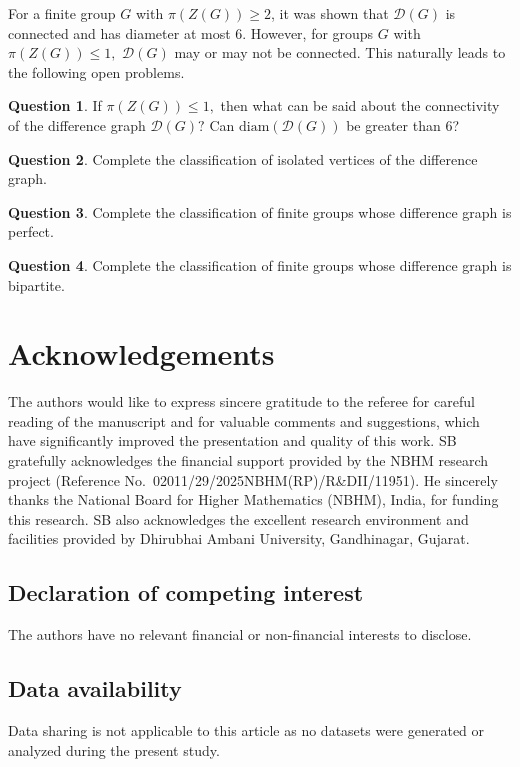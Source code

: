\documentclass[12pt]{amsart}
\theoremstyle{plain}
\theoremstyle{remark}
\theoremstyle{definition}
\newtheorem{question}{Question}[section]
\begin{document}
For a finite group $G$ with $\pi(Z(G))\geq 2$, it was shown that $\mathcal{D}(G)$ is connected 
and has diameter at most $6$. 
However, for groups $G$ with $\pi(Z(G))\leq 1,$  $\mathcal{D}(G)$ may or may not be connected. 
This naturally leads to the following open problems.

\begin{question}\label{Q111}
If $\pi(Z(G))\leq 1,$ then what can be said about the connectivity of the difference graph $\mathcal{D}(G)?$ Can 
$\mathrm{diam}(\mathcal{D}(G))$ be greater than $6$? 
\end{question}

\begin{question}\label{Q112}
Complete the classification of isolated vertices of the difference graph.
\end{question}

\begin{question}\label{Q113}
Complete the classification of finite groups whose difference graph is perfect.
\end{question}

\begin{question}\label{Q114}
Complete the classification of finite groups whose difference graph is bipartite.
\end{question}

\section*{Acknowledgements} 
The authors would like to express sincere gratitude to the referee for careful
reading of the manuscript and for valuable comments and suggestions, which
have significantly improved the presentation and quality of this work. SB gratefully acknowledges the financial support provided by the NBHM research project (Reference No.~02011/29/2025NBHM(RP)/R\&DII/11951). He sincerely thanks the National Board for Higher Mathematics (NBHM), India, for funding this research. SB also acknowledges the excellent research environment and facilities provided by Dhirubhai Ambani University, Gandhinagar, Gujarat. 

\subsection*{Declaration of competing interest}
The authors have no relevant financial or non-financial interests to disclose.

\subsection*{Data availability}
Data sharing is not applicable to this article as no datasets were generated or analyzed 
during the present study.
\end{document}
